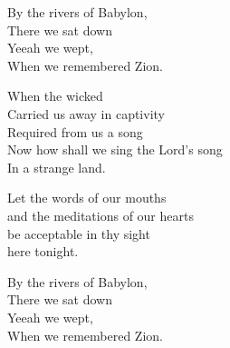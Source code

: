 
\strofa By the rivers of Babylon,\\
There we sat down\\
Yeeah we wept,\\
When we remembered Zion. 

\spazio

\strofa When the wicked\\
Carried us away in captivity\\
Required from us a song\\
Now how shall we sing the Lord's song\\
In a strange land. 

\spazio

\strofa Let the words of our mouths\\
and the meditations of our hearts\\
be acceptable in thy sight\\
here tonight. 

\spazio

\strofa By the rivers of Babylon,\\
There we sat down\\
Yeeah we wept,\\
When we remembered Zion. 